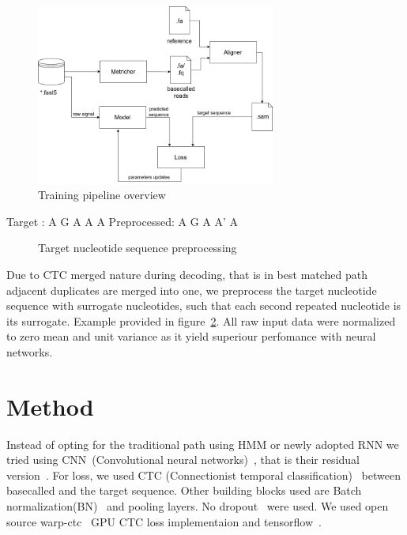 \documentclass[runningheads,a4paper]{llncs}
\begin{document}
\begin{figure}[!ht]
	\begin{center}
		\includegraphics[width=0.7\textwidth]{./imgs/train_pipeline.png}
		\caption{Training pipeline overview}
		\label{fg:train_pipe}
	\end{center}
\end{figure}

\begin{verbbox}
    Target      :  A  G  A  A  A
    Preprocessed:  A  G  A  A' A
\end{verbbox}

\begin{figure}[!h]
    \centering
    \theverbbox
    \caption{Target nucleotide sequence preprocessing}
    \label{fig:data_preprocessing}
\end{figure}

Due to CTC merged nature during decoding, that is in best matched path adjacent duplicates are merged into one, we preprocess the target nucleotide sequence with surrogate nucleotides, such that each second repeated nucleotide is its surrogate. Example provided in figure~\ref{fig:data_preprocessing}. All raw input data were normalized to zero mean and unit variance as it yield superiour perfomance with neural networks.

\section{Method}
Instead of opting for the traditional path using HMM or newly adopted RNN we tried using CNN~(Convolutional neural networks)~\cite{lecun-98}, that is their residual version~\cite{he2016deep}. For loss, we used CTC (Connectionist temporal classification)~\cite{graves2006connectionist} between basecalled and the target sequence. Other building blocks used are Batch normalization(BN)~\cite{BNORM} and pooling layers. No dropout~\cite{srivastava2014dropout} were used. We used open source warp-ctc~\cite{warpctc} GPU CTC loss implementaion and tensorflow~\cite{tensorflow2015-whitepaper}.
\end{document}
